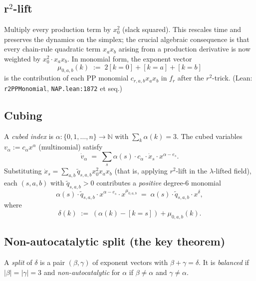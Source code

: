 \documentclass[11pt]{article}
\newcommand{\N}{\mathbb{N}}
\newcommand{\slack}{0}
\begin{document}
\subsection{r$^2$-lift}
Multiply every production term by $x_\slack^2$ (slack squared). This
rescales time and preserves the dynamics on the simplex; the crucial
algebraic consequence is that every chain-rule quadratic term
$x_a x_b$ arising from a production derivative is now weighted by
$x_\slack^2 \cdot x_a x_b$. In monomial form, the exponent vector
\begin{equation}
    \mu_{\slack, a, b}(k) \;:=\; 2 [k = \slack] + [k = a] + [k = b]
    \tag{$\mu$}
\end{equation}
is the contribution of each PP monomial $c_{r,a,b} x_a x_b$ in $f_r$ after
the $r^2$-trick. (Lean: \verb|r2PPMonomial|, \texttt{NAP.lean:1872} et seq.)

\subsection{Cubing}
A \emph{cubed index} is $\alpha : \{0, 1, \dots, n\} \to \N$ with
$\sum_k \alpha(k) = 3$. The cubed variables $v_\alpha := c_\alpha x^\alpha$
(multinomial) satisfy
\[
    \dot v_\alpha \;=\; \sum_{s} \alpha(s) \cdot c_\alpha \cdot
        \dot x_s \cdot x^{\alpha - e_s}.
\]
Substituting $\dot x_s = \sum_{a,b} \widetilde q_{s,a,b} x_\slack^2 x_a x_b$
(that is, applying $r^2$-lift in the $\lambda$-lifted field), each
$(s, a, b)$ with $\widetilde q_{s,a,b} > 0$ contributes a \emph{positive}
degree-$6$ monomial
\[
    \alpha(s) \cdot \widetilde q_{s,a,b} \cdot x^{\alpha - e_s} \cdot x^{\mu_{\slack, a, b}}
    \;=\; \alpha(s) \cdot \widetilde q_{s,a,b} \cdot x^{\delta},
\]
where
\begin{equation}
    \delta(k) \;:=\; (\alpha(k) - [k = s]) + \mu_{\slack,a,b}(k).
    \tag{$\delta$}
\end{equation}

\subsection{Non-autocatalytic split (the key theorem)}
A \emph{split} of $\delta$ is a pair $(\beta, \gamma)$ of exponent vectors
with $\beta + \gamma = \delta$. It is \emph{balanced} if
$|\beta| = |\gamma| = 3$ and \emph{non-autocatalytic} for $\alpha$ if
$\beta \ne \alpha$ and $\gamma \ne \alpha$.
\end{document}
